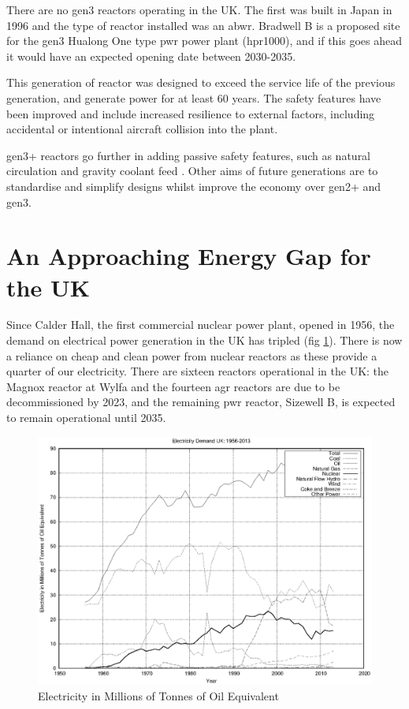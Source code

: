 There are no \acrshort{gen3} reactors operating in the UK.  The first was built in Japan in 1996 and the type of reactor installed was an \acrfull{abwr}.  Bradwell B is a proposed site for the \acrshort{gen3} Hualong One type \acrshort{pwr} power plant (\acrshort{hpr}1000), and if this goes ahead it would have an expected opening date between 2030-2035.   

This generation of reactor was designed to exceed the service life of the previous generation, and generate power for at least 60 years.  The safety features have been improved and include increased resilience to external factors, including accidental or intentional aircraft collision into the plant\cite{genIIIimprovements}.

\acrshort{gen3+} reactors go further in adding passive safety features, such as natural circulation and gravity coolant feed \cite{geniiiplussafety}.  Other aims of future generations are to standardise and simplify designs whilst improve the economy over \acrshort{gen2+} and \acrshort{gen3}. 


\section{An Approaching Energy Gap for the UK}

Since Calder Hall, the first commercial nuclear power plant, opened in 1956, the demand on electrical power generation in the UK has tripled (fig \ref{fig:electricityusagesuk}).  There is now a reliance on cheap and clean power from nuclear reactors as these provide a quarter of our electricity.  There are sixteen reactors operational in the UK:  the Magnox reactor at Wylfa and the fourteen \acrshort{agr} reactors are due to be decommissioned by 2023\cite{gen4}, and the remaining \acrshort{pwr} reactor, Sizewell B, is expected to remain operational until 2035\cite{gen4}.

\begin{figure}[tbp]
  \begin{center}
    \includegraphics[width=.7\linewidth]{chapters/introduction/plots/elec_demand/elec_demand.eps}
    \caption{Electricity in Millions of Tonnes of Oil Equivalent}
    \label{fig:electricityusagesuk}
  \end{center}
\end{figure}

